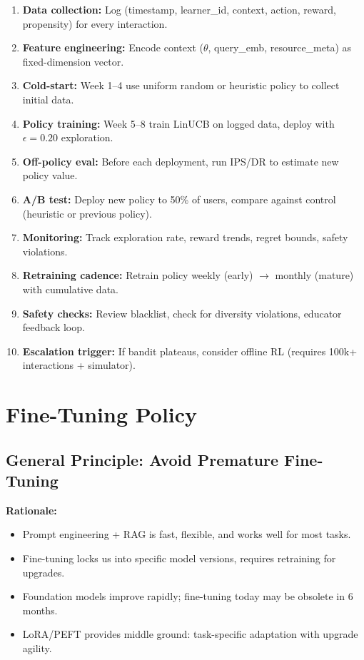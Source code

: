 \documentclass[11pt,letterpaper]{article}
\begin{document}
\begin{enumerate}
\item \textbf{Data collection:} Log (timestamp, learner\_id, context, action, reward, propensity) for every interaction.
\item \textbf{Feature engineering:} Encode context ($\theta$, query\_emb, resource\_meta) as fixed-dimension vector.
\item \textbf{Cold-start:} Week 1--4 use uniform random or heuristic policy to collect initial data.
\item \textbf{Policy training:} Week 5--8 train LinUCB on logged data, deploy with $\epsilon = 0.20$ exploration.
\item \textbf{Off-policy eval:} Before each deployment, run IPS/DR to estimate new policy value.
\item \textbf{A/B test:} Deploy new policy to 50\% of users, compare against control (heuristic or previous policy).
\item \textbf{Monitoring:} Track exploration rate, reward trends, regret bounds, safety violations.
\item \textbf{Retraining cadence:} Retrain policy weekly (early) $\rightarrow$ monthly (mature) with cumulative data.
\item \textbf{Safety checks:} Review blacklist, check for diversity violations, educator feedback loop.
\item \textbf{Escalation trigger:} If bandit plateaus, consider offline RL (requires 100k+ interactions + simulator).
\end{enumerate}

\newpage

\section{Fine-Tuning Policy}

\subsection{General Principle: Avoid Premature Fine-Tuning}

\textbf{Rationale:}
\begin{itemize}
\item Prompt engineering + RAG is fast, flexible, and works well for most tasks.
\item Fine-tuning locks us into specific model versions, requires retraining for upgrades.
\item Foundation models improve rapidly; fine-tuning today may be obsolete in 6 months.
\item LoRA/PEFT provides middle ground: task-specific adaptation with upgrade agility.
\end{itemize}
\end{document}
